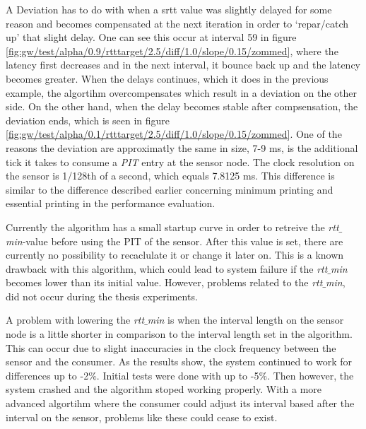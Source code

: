 A Deviation has to do with when a srtt value was slightly delayed for some reason and becomes compensated at the next iteration in order to `repar/catch up' that slight delay. One can see this occur at interval 59 in figure \ref{fig:gw/test/alpha/0.9/rtttarget/2.5/diff/1.0/slope/0.15/zommed}, where the latency first decreases and in the next interval, it bounce back up and the latency becomes greater. When the delays continues, which it does in the previous example, the algortihm overcompensates which result in a deviation on the other side. On the other hand, when the delay becomes stable after compsensation, the deviation ends, which is seen in figure \ref{fig:gw/test/alpha/0.1/rtttarget/2.5/diff/1.0/slope/0.15/zommed}. One of the reasons the deviation are approximatly the same in size, 7-9 ms, is the additional tick it takes to consume a \textit{PIT} entry at the sensor node. The clock resolution on the sensor is 1/128th of a second, which equals 7.8125 ms. This difference is similar to the difference described earlier concerning minimum printing and essential printing in the performance evaluation.


Currently the algorithm has a small startup curve in order to retreive the \textit{rtt$\_$min}-value before using the PIT of the sensor. After this value is set, there are currently no possibility to recaclulate it or change it later on. This is a known drawback with this algorithm, which could lead to system failure if the \textit{rtt$\_$min} becomes lower than its initial value. However, problems related to the \textit{rtt$\_$min}, did not occur during the thesis experiments.

A problem with lowering the \textit{rtt$\_$min} is when the interval length on the sensor node is a little shorter in comparison to the interval length set in the algorithm. This can occur due to slight inaccuracies in the clock frequency between the sensor and the consumer. 
As the results show, the system continued to work for differences up to -2$\%$. Initial tests were done with up to -5$\%$. Then however, the system crashed and the algorithm stoped working properly. With a more advanced algortihm where the consumer could adjust its interval based after the interval on the sensor, problems like these could cease to exist.

